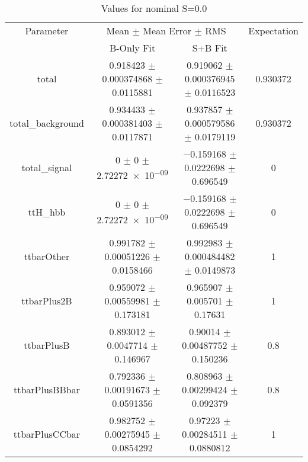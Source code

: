 \begin{table}
\centering
\caption{Values for nominal S=0.0}
\begin{tabular}{cccc}
\toprule
Parameter & \multicolumn{2}{c}{Mean $\pm$ Mean Error $\pm$ RMS} & Expectation\\
 & B-Only Fit & S+B Fit & \\
\midrule
total & \num{0.918423} $\pm$ \num{0.000374868} $\pm$ \num{0.0115881} & \num{0.919062} $\pm$ \num{0.000376945} $\pm$ \num{0.0116523} & \num{0.930372}\\
total\_background & \num{0.934433} $\pm$ \num{0.000381403} $\pm$ \num{0.0117871} & \num{0.937857} $\pm$ \num{0.000579586} $\pm$ \num{0.0179119} & \num{0.930372}\\
total\_signal & \num{0} $\pm$ \num{0} $\pm$ \num{2.72272e-09} & \num{-0.159168} $\pm$ \num{0.0222698} $\pm$ \num{0.696549} & \num{0}\\
ttH\_hbb & \num{0} $\pm$ \num{0} $\pm$ \num{2.72272e-09} & \num{-0.159168} $\pm$ \num{0.0222698} $\pm$ \num{0.696549} & \num{0}\\
ttbarOther & \num{0.991782} $\pm$ \num{0.00051226} $\pm$ \num{0.0158466} & \num{0.992983} $\pm$ \num{0.000484482} $\pm$ \num{0.0149873} & \num{1}\\
ttbarPlus2B & \num{0.959072} $\pm$ \num{0.00559981} $\pm$ \num{0.173181} & \num{0.965907} $\pm$ \num{0.005701} $\pm$ \num{0.17631} & \num{1}\\
ttbarPlusB & \num{0.893012} $\pm$ \num{0.0047714} $\pm$ \num{0.146967} & \num{0.90014} $\pm$ \num{0.00487752} $\pm$ \num{0.150236} & \num{0.8}\\
ttbarPlusBBbar & \num{0.792336} $\pm$ \num{0.00191673} $\pm$ \num{0.0591356} & \num{0.808963} $\pm$ \num{0.00299424} $\pm$ \num{0.092379} & \num{0.8}\\
ttbarPlusCCbar & \num{0.982752} $\pm$ \num{0.00275945} $\pm$ \num{0.0854292} & \num{0.97223} $\pm$ \num{0.00284511} $\pm$ \num{0.0880812} & \num{1}\\
\bottomrule
\end{tabular}
\end{table}